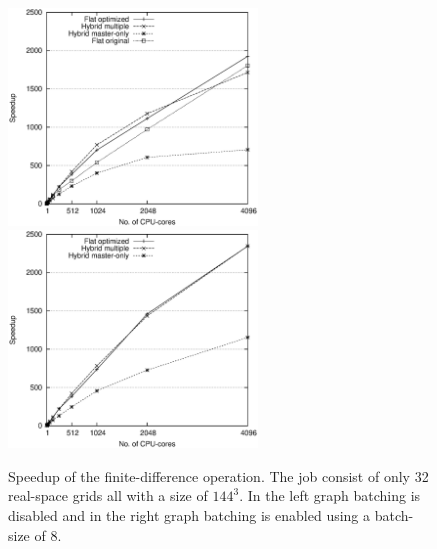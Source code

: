 \documentclass[conference]{IEEEtran}
\begin{document}
\begin{figure}
\centerline{
\mbox{\includegraphics[width=250px]{gfx/fidi_speedup}}
\mbox{\includegraphics[width=250px]{gfx/fidi_batchspeedup}}
} 
 \caption{Speedup of the finite-difference operation. The job consist of only 32 real-space grids all with a size of $144^3$. In the left graph batching is disabled and in the right graph batching is enabled using a batch-size of 8.}
 \label{fig:speedup}
\end{figure}
\end{document}
